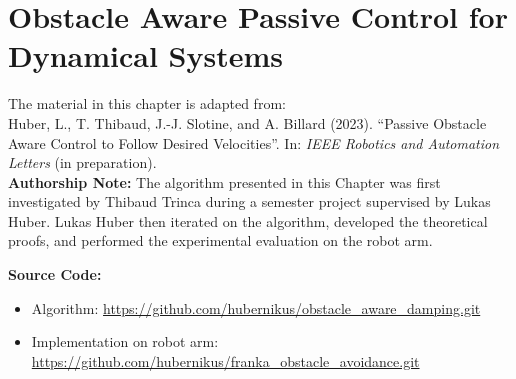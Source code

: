 \chapter{Obstacle Aware Passive Control for Dynamical Systems} \label{chap:passivity_aware_damping}
% 
% 
\begin{publicationbox}
	The material in this chapter is adapted from: \\
	Huber, L., T. Thibaud, J.-J. Slotine, and A. Billard (2023). “Passive Obstacle Aware Control to Follow Desired Velocities”. In: \textit{IEEE Robotics and Automation Letters} (in preparation). \\

\textbf{Authorship Note:}
 The algorithm presented in this Chapter was first investigated by Thibaud Trinca during a semester project supervised by Lukas Huber.
 Lukas Huber then iterated on the algorithm, developed the theoretical proofs, and performed the experimental evaluation on the robot arm.

\textbf{Source Code:}
\begin{itemize}
	\setlength\itemsep{-0.0em}
\item Algorithm:
	\url{https://github.com/hubernikus/obstacle_aware_damping.git}
\item Implementation on robot arm: \\
	\url{https://github.com/hubernikus/franka_obstacle_avoidance.git} 
\end{itemize}


\end{publicationbox}

